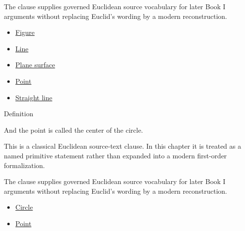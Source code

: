\begin{remark*}[Interpretation]
The clause supplies governed Euclidean source vocabulary for later Book I
arguments without replacing Euclid's wording by a modern reconstruction.
\end{remark*}

\begin{lra-not-visible}
\begin{dependencies}
\begin{itemize}
  \item \hyperref[def:euclid-figure]{Figure}
  \item \hyperref[def:euclid-line]{Line}
  \item \hyperref[def:euclid-plane-surface]{Plane surface}
  \item \hyperref[def:euclid-point]{Point}
  \item \hyperref[def:euclid-straight-line]{Straight line}
\end{itemize}
\end{dependencies}
\end{lra-not-visible}

\begin{definitionbox}{Definition}
\begin{definition}
\label{def:euclid-center-of-a-circle}
And the point is called the center of the circle.
\end{definition}
\end{definitionbox}
\begin{remark*}
This is a classical Euclidean source-text clause. In this chapter it is treated
as a named primitive statement rather than expanded into a modern first-order
formalization.
\end{remark*}

\begin{remark*}[Interpretation]
The clause supplies governed Euclidean source vocabulary for later Book I
arguments without replacing Euclid's wording by a modern reconstruction.
\end{remark*}

\begin{lra-not-visible}
\begin{dependencies}
\begin{itemize}
  \item \hyperref[def:euclid-circle]{Circle}
  \item \hyperref[def:euclid-point]{Point}
\end{itemize}
\end{dependencies}
\end{lra-not-visible}

